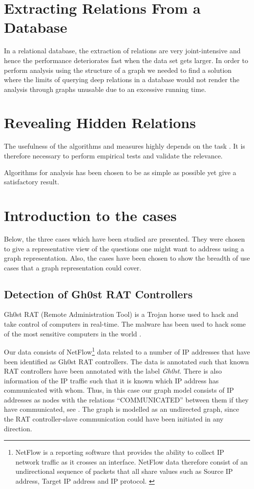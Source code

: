 \section{Extracting Relations From a Database}
In a relational database, the extraction of relations are very joint-intensive and hence the performance deteriorates fast when the data set gets larger\cite{robinson2013}. In order to perform analysis using the structure of a graph we needed to find a solution where the limits of querying deep relations in a database would not render the analysis through graphs unusable due to an excessive running time.


\section{Revealing Hidden Relations}

The usefulness of the algorithms and measures highly depends on the task \cite{fouss2016algorithms}. It is therefore necessary to perform empirical tests and validate the relevance. 

Algorithms for analysis has been chosen to be as simple as possible yet give a satisfactory result. 


\section{Introduction to the cases \label{cases}}
Below, the three cases which have been studied are presented. They were chosen to give a representative view of the questions one might want to address using a graph representation. Also, the cases have been chosen to show the breadth of use cases that a graph representation could cover.

\subsection{Detection of Gh0st RAT Controllers \label{methodGhost}}
Gh0st RAT (Remote Administration Tool) is a Trojan horse used to hack and take control of computers in real-time. The malware has been used to hack some of the most sensitive computers in the world \citep{cyberspies}.

Our data consists of NetFlow\footnote{NetFlow is a reporting software that provides the ability to collect IP network traffic as it crosses an interface. NetFlow data therefore consist of an undirectional sequence of packets that all share values such as Source IP address, Target IP address and IP protocol. \citep{netflow}} data related to a number of IP addresses that have been identified as Gh0st RAT controllers. The data is annotated such that known RAT controllers have been annotated with the label \textit{Gh0st}. There is also information of the IP traffic such that it is known which IP address has communicated with whom. Thus, in this case our graph model consists of IP addresses as nodes with the relations ``COMMUNICATED'' between them if they have communicated, see . The graph is modelled as an undirected graph, since the RAT controller-slave communication could have been initiated in any direction.

